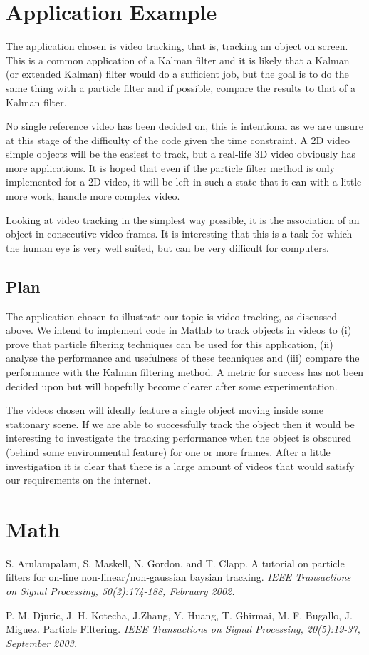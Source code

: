 \documentclass[11pt]{article}
\begin{document}
\section{Application Example}
The application chosen is video tracking, that is, tracking an object on screen.
This is a common application of a Kalman filter and it is likely that a Kalman
(or extended Kalman) filter would do a sufficient job, but the goal is to do the
same thing with a particle filter and if possible, compare the results to that
of a Kalman filter.

No single reference video has been decided on, this is intentional as we are
unsure at this stage of the difficulty of the code given the time constraint. A
2D video simple objects will be the easiest to track, but a real-life 3D video
obviously has more applications. It is hoped that even if the particle filter
method is only implemented for a 2D video, it will be left in such a state that
it can with a little more work, handle more complex video.

Looking at video tracking in the simplest way possible, it is the association of
an object in consecutive video frames. It is interesting that this is a task
for which the human eye is very well suited, but can be very difficult for
computers. 

\subsection{Plan}
The application chosen to illustrate our topic is video tracking, as discussed
above. We intend to implement code in Matlab to track objects in videos to (i)
prove that particle filtering techniques can be used for this application,
(ii) analyse the performance and usefulness of these techniques and (iii)
compare the performance with the Kalman filtering method. A metric for success
has not been decided upon but will hopefully become clearer after some
experimentation.

The videos chosen will ideally feature a single object moving inside some
stationary scene. If we are able to successfully track the object then it would
be interesting to investigate the tracking performance when the object is
obscured (behind some environmental feature) for one or more frames. After a
little investigation it is clear that there is a large amount of videos that
would satisfy our requirements on the internet.

\section{Math}

\begin{thebibliography}{99}
 S. Arulampalam, S. Maskell, N. Gordon, and T. Clapp. A tutorial
on particle filters for on-line non-linear/non-gaussian baysian tracking.
\emph{IEEE Transactions on Signal Processing, 50(2):174-188, February 2002.}

 P. M. Djuric, J. H. Kotecha, J.Zhang, Y. Huang, T. Ghirmai, M.
F. Bugallo, J. Miguez. Particle Filtering. \emph{IEEE Transactions on Signal
Processing, 20(5):19-37, September 2003.}
\end{thebibliography}
\end{document}
